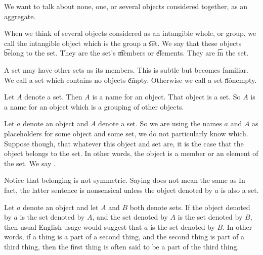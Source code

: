 

We want to talk about none, one, or several objects considered together, as an aggregate.


When we think of several objects considered as an intangible whole, or group, we call the intangible object which is the group a \t{set}.
We say that these objects \t{belong} to the set.
They are the set's \t{members} or \t{elements}.
They are \t{in} the set.


A set may have other sets as its members.
This is subtle but becomes familiar.
We call a set which contains no objects \t{empty}.
Otherwise we call a set \t{nonempty}.


Let $A$ denote a set.
Then $A$ is a name for an object.
That object is a set.
So $A$ is a name for an object which is a grouping of other objects.


Let $a$ denote an object and $A$ denote a set.
So we are using the names $a$ and $A$ as placeholders for some object and some set, we do not particularly know which.
Suppose though, that whatever this object and set are, it is the case that the object belongs to the set.
In other words, the object is a member or an element of the set.
We say .


Notice that belonging is not symmetric.
Saying  does not mean the same as 
In fact, the latter sentence is nonsensical unless the object denoted by $a$ is also a set.


Let $a$ denote an object and let $A$ and $B$ both denote sets.
If the object denoted by $a$ is  the set denoted by $A$, and the set denoted by $A$ is  the set denoted by $B$, then usual English usage would suggest that $a$ is  the set denoted by $B$.
In other words, if a thing is a part of a second thing, and the second thing is part of a third thing, then the first thing is often said to be a part of the third thing.

